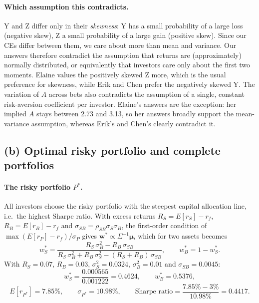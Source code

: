 \documentclass[11pt]{article}
\begin{document}
\paragraph{Which assumption this contradicts.}
Y and Z differ only in their \emph{skewness}: Y has a small probability of a large loss (negative skew), Z a small probability of a large gain (positive skew). Since our CEs differ between them, we care about more than mean and variance. Our answers therefore contradict the assumption that returns are (approximately) normally distributed, or equivalently that investors care only about the first two moments. Elaine values the positively skewed Z more, which is the usual preference for skewness, while Erik and Chen prefer the negatively skewed Y. The variation of $A$ across bets also contradicts the assumption of a single, constant risk-aversion coefficient per investor. Elaine's answers are the exception: her implied $A$ stays between 2.73 and 3.13, so her answers broadly support the mean-variance assumption, whereas Erik's and Chen's clearly contradict it.

\subsection*{(b) Optimal risky portfolio and complete portfolios}

\paragraph{The risky portfolio $P^*$.}
All investors choose the risky portfolio with the steepest capital allocation line, i.e.\ the highest Sharpe ratio. With excess returns $R_S = E[r_S] - r_f$, $R_B = E[r_B] - r_f$ and $\sigma_{SB} = \rho_{SB}\sigma_S\sigma_B$, the first-order condition of $\max (E[r_P] - r_f)/\sigma_P$ gives $\mathbf w^* \propto \Sigma^{-1}\boldsymbol\mu$, which for two assets becomes
\[
w_S^* = \frac{R_S\,\sigma_B^2 - R_B\,\sigma_{SB}}{R_S\,\sigma_B^2 + R_B\,\sigma_S^2 - (R_S + R_B)\,\sigma_{SB}}, \qquad w_B^* = 1 - w_S^*.
\]
With $R_S = 0.07$, $R_B = 0.03$, $\sigma_S^2 = 0.0324$, $\sigma_B^2 = 0.01$ and $\sigma_{SB} = 0.0045$:
\[
w_S^* = \frac{0.000565}{0.001222} = 0.4624, \qquad w_B^* = 0.5376,
\]
\[
E[r_{P^*}] = 7.85\%, \qquad \sigma_{P^*} = 10.98\%, \qquad \text{Sharpe ratio} = \frac{7.85\% - 3\%}{10.98\%} = 0.4417.
\]
\end{document}
